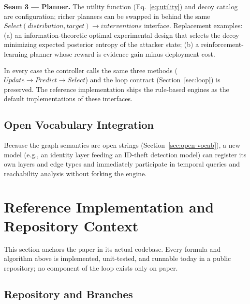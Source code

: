 \documentclass[preprints,article,accept,oneauthor]{Definitions/mdpi}
\begin{document}
\textbf{Seam 3 --- Planner.} The utility function (Eq.~\ref{eq:utility}) and
decoy catalog are configuration; richer planners can be swapped in behind
the same
$\mathit{Select}(\mathit{distribution}, \mathit{target}) \to
\mathit{interventions}$ interface. Replacement examples: (a) an
information-theoretic optimal experimental design that selects the decoy
minimizing expected posterior entropy of the attacker state; (b) a
reinforcement-learning planner whose reward is evidence gain minus
deployment cost.

In every case the controller calls the same three methods
($\mathit{Update} \to \mathit{Predict} \to \mathit{Select}$) and the loop
contract (Section~\ref{sec:loop}) is preserved. The reference implementation
ships the rule-based engines as the default implementations of these
interfaces.

\subsection{Open Vocabulary Integration}

Because the graph semantics are open strings (Section~\ref{sec:open-vocab}), a new
model (e.g., an identity layer feeding an ID-theft detection model) can
register its own layers and edge types and immediately participate in
temporal queries and reachability analysis without forking the engine.

\section{Reference Implementation and Repository Context}
\label{sec:repo}

This section anchors the paper in its actual codebase. Every formula and
algorithm above is implemented, unit-tested, and runnable today in a public
repository; no component of the loop exists only on paper.

\subsection{Repository and Branches}
\end{document}
